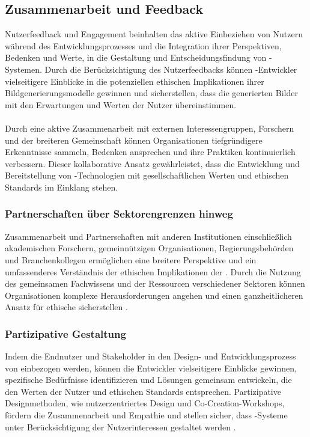 \documentclass[hidelinks,12pt]{report}
\begin{document}
\subsection{Zusammenarbeit und Feedback}
Nutzerfeedback und Engagement beinhalten das aktive Einbeziehen von Nutzern während des Entwicklungsprozesses und die Integration ihrer Perspektiven, Bedenken und Werte, in die Gestaltung und Entscheidungsfindung von -Systemen. Durch die Berücksichtigung des Nutzerfeedbacks können -Entwickler vielseitigere Einblicke in die potenziellen ethischen Implikationen ihrer Bildgenerierungsmodelle gewinnen und sicherstellen, dass die generierten Bilder mit den Erwartungen und Werten der Nutzer übereinstimmen.
\\\\
Durch eine aktive Zusammenarbeit mit externen Interessengruppen, Forschern und der breiteren Gemeinschaft können Organisationen tiefgründigere Erkenntnisse sammeln, Bedenken ansprechen und ihre Praktiken kontinuierlich verbessern. Dieser kollaborative Ansatz gewährleistet, dass die Entwicklung und Bereitstellung von  -Technologien mit gesellschaftlichen Werten und ethischen Standards im Einklang stehen.
\\
\subsubsection{Partnerschaften über Sektorengrenzen hinweg}
Zusammenarbeit und Partnerschaften mit anderen Institutionen einschließlich akademischen Forschern, gemeinnützigen Organisationen, Regierungsbehörden und Branchenkollegen ermöglichen eine breitere Perspektive und ein umfassenderes Verständnis der ethischen Implikationen der . Durch die Nutzung des gemeinsamen Fachwissens und der Ressourcen verschiedener Sektoren können Organisationen komplexe Herausforderungen angehen und einen ganzheitlicheren Ansatz für ethische  sicherstellen \cite{Vogel}.
\\
\subsubsection{Partizipative Gestaltung}
Indem die Endnutzer und Stakeholder in den Design- und Entwicklungsprozess von   einbezogen werden, können die Entwickler vielseitigere Einblicke gewinnen, spezifische Bedürfnisse identifizieren und Lösungen gemeinsam entwickeln, die den Werten der Nutzer und ethischen Standards entsprechen. Partizipative Designmethoden, wie nutzerzentriertes Design und Co-Creation-Workshops, fördern die Zusammenarbeit und Empathie und stellen sicher, dass -Systeme unter Berücksichtigung der Nutzerinteressen gestaltet werden \cite{Zytko}.
\\
\end{document}
